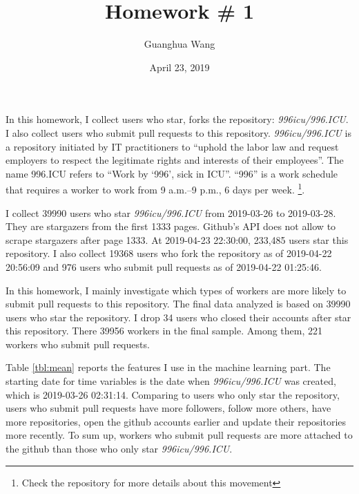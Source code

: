 
\title{Homework \# 1}
\date{April 23, 2019}
\author{Guanghua Wang}


\maketitle

In this homework, I collect users who star, forks the repository: \textit{996icu/996.ICU}. I also collect users who submit pull requests to this repository. \textit{996icu/996.ICU} is a repository initiated by IT practitioners to ``uphold the labor law and request employers to respect the legitimate rights and interests of their employees''. The name 996.ICU refers to ``Work by `996', sick in ICU''. ``996'' is a work schedule that requires a worker to work from 9 a.m.–9 p.m., 6 days per week. \footnote{Check the repository for more details about this movement}.

I collect 39990 users who star \textit{996icu/996.ICU} from 2019-03-26 to 2019-03-28. They are stargazers from the first 1333 pages. Github's API does not allow to scrape stargazers after page 1333. At 2019-04-23 22:30:00, 233,485 users star this repository. I also collect 19368 users who fork the repository as of 2019-04-22 20:56:09 and 976 users who submit pull requests as of 2019-04-22 01:25:46.

In this homework, I mainly investigate which types of workers are more likely to submit pull requests to this repository. The final data analyzed is based on 39990 users who star the repository. I drop 34 users who closed their accounts after star this repository. There 39956 workers in the final sample. Among them, 221 workers who submit pull requests.

Table \ref{tbl:mean} reports the features I use in the machine learning part. The starting date for time variables is the date when \textit{996icu/996.ICU} was created, which is 2019-03-26 02:31:14. Comparing to users who only star the repository, users who submit pull requests have more followers, follow more others, have more repositories, open the github accounts earlier and update their repositories more recently. To sum up, workers who submit pull requests are more attached to the github than those who only star  \textit{996icu/996.ICU}.

